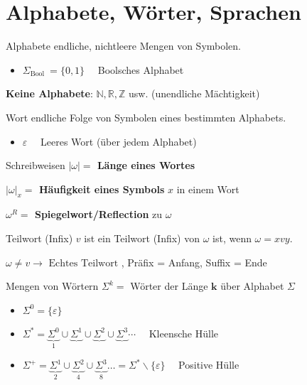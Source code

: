\section*{Alphabete, Wörter, Sprachen}

\begin{definition}{Alphabete} endliche, nichtleere Mengen von Symbolen.
\begin{itemize}
  \item $\Sigma_{\text {Bool }}=\{0,1\} \quad$ Boolsches Alphabet
\end{itemize}
\textbf{Keine Alphabete}: $\mathbb{N}, \mathbb{R}, \mathbb{Z}$ usw. (unendliche Mächtigkeit)
\end{definition}

\begin{definition}{Wort}
    endliche Folge von Symbolen eines bestimmten Alphabets.
    \begin{itemize}
    \item $\varepsilon \quad$ Leeres Wort (über jedem Alphabet)
    \end{itemize}
\end{definition}

\begin{definition}{Schreibweisen}
    \textbf{$|\omega|=$ Länge eines Wortes}

    \textbf{$|\omega|_{x}=$ Häufigkeit eines Symbols} $x$ in einem Wort

    \textbf{$\omega^{R}=$ Spiegelwort/Reflection} zu $\omega$
\end{definition}

\begin{definition}{Teilwort (Infix)}
    $v$ ist ein Teilwort (Infix) von $\omega$ ist, wenn $\omega=x v y$.

    $\omega \neq v \rightarrow \text { Echtes Teilwort }$, Präfix = Anfang, Suffix = Ende
\end{definition}

\begin{definition}{Mengen von Wörtern}
    $\Sigma^{k}=$ Wörter der Länge $\boldsymbol{k}$ über Alphabet $\Sigma$
    \begin{itemize}
        \item $\Sigma^{0}=\{\varepsilon\}$
        \item $\Sigma^{*}=\underbrace{\Sigma^{0}}_{1} \cup \underbrace{\Sigma^{1}} \cup \underbrace{\Sigma^{2}} \cup \underbrace{\Sigma^{3}} \cdots \quad$ Kleensche Hülle
        \item $\Sigma^{+}=\underbrace{\Sigma^{1}}_{2} \cup \underbrace{\Sigma^{2}}_{4} \cup \underbrace{\Sigma^{3}}_{8} \ldots=\Sigma^{*} \backslash\{\varepsilon\} \quad$ Positive Hülle
      \end{itemize}
\end{definition}

